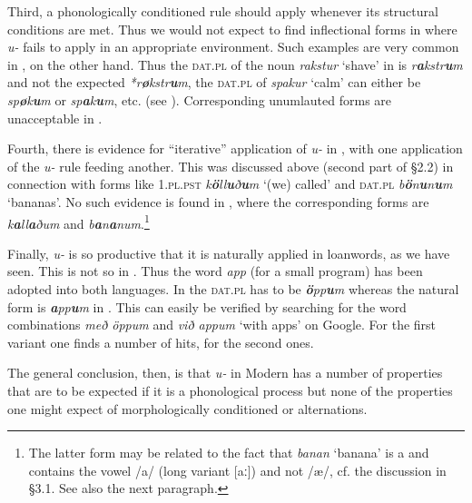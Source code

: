 \documentclass[output=paper,
modfonts
]{LSP/langsci}
\begin{document}
\begin{exe}
Third, a phonologically conditioned rule should apply whenever its
structural conditions are met. Thus we would not expect to find
inflectional forms in  where \emph{u-} fails to apply in
an appropriate environment. Such examples are very common in , on
the other hand. Thus the \textsc{dat.pl} of the noun \emph{rakstur}
`shave' in  is \emph{r\textbf{a}kstr\textbf{u}m} and not the
expected \emph{*r\textbf{ø}kstr\textbf{u}m}, the \textsc{dat.pl} of
\emph{spakur} `calm' can either be \emph{sp\textbf{ø}k\textbf{u}m} or
\emph{sp\textbf{a}k\textbf{u}m}, etc. (see \citealt[79, 100, passim]{thrainsson2012}). Corresponding unumlauted forms are unacceptable in
.

Fourth, there is evidence for ``iterative'' application of
\emph{u-} in , with one application of the
\emph{u-} rule feeding another. This was discussed above (second
part of \S2.2) in connection with forms like \textsc{1.pl.pst}
\emph{k\textbf{ö}ll\textbf{u}ð\textbf{u}m} `(we) called' and
\textsc{dat.pl} \emph{b\textbf{ö}n\textbf{u}n\textbf{u}m} `bananas'. No
such evidence is found in , where the corresponding forms are
\emph{k\textbf{a}ll\textbf{a}ðum} and
\emph{b\textbf{a}n\textbf{a}num}.\footnote{The latter form may be
  related to the fact that \emph{banan} `banana' is a  and
  contains the vowel /a/ (long variant {[}aː{]}) and not /æ/, cf. the
  discussion in \S3.1. See also the next paragraph.}

\newpage 
Finally,  \emph{u-} is so productive that it is naturally
applied in loanwords, as we have seen. This is not so in . Thus
the word \emph{app} (for a small program) has been adopted into both
languages. In  the \textsc{dat.pl} has to be
\emph{\textbf{ö}pp\textbf{u}m} whereas the natural form is
\emph{\textbf{a}pp\textbf{u}m} in . This can easily be verified
by searching for the word combinations \emph{með öppum} and \emph{við
appum} `with apps' on Google. For the first variant one finds a number
of  hits, for the second  ones.

The general conclusion, then, is that \emph{u-} in Modern
 has a number of properties that are to be expected if it is a
phonological process but none of the properties one might expect of
morphologically conditioned or  alternations.



\end{exe}
\end{document}
